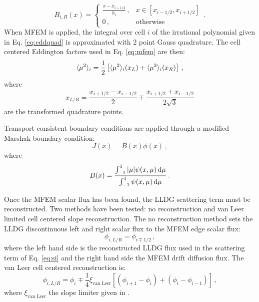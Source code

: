 	\begin{equation}
		B_{i,R}(x) = \begin{cases}
			\frac{x - x_{i-1/2}}{h_i} \,, & x \in [x_{i-1/2}, x_{i+1/2}] \\ 
			0 \,, & \text{otherwise}
		\end{cases} \,.
	\end{equation}
When MFEM is applied, the integral over cell $i$ of the irrational polynomial given in Eq. \ref{eq:eddquad} is approximated with 2 point Gauss quadrature. The cell centered Eddington factors used in Eq. \ref{eq:mfem} are then: 
	\begin{equation} 
		\langle \mu^2 \rangle_i = \frac{1}{2} \left[ \langle \mu^2 \rangle_i(x_L) + \langle \mu^2 \rangle_i(x_R) \right] \,,
	\end{equation}
where 
	\begin{equation}
		x_{L/R} = \frac{x_{i+1/2} - x_{i-1/2}}{2} \mp \frac{x_{i+1/2} + x_{i-1/2}}{2\sqrt{3}}
	\end{equation}
are the transformed quadrature points. 

Transport consistent boundary conditions are applied through a modified Marshak boundary condition: 
	\begin{equation} 
		J(x) = B(x) \phi(x) \,,
	\end{equation} 
where 
	\begin{equation} 
		B(x) = \frac{\int_{-1}^1 |\mu| \psi(x, \mu) \mathop{}\!\mathrm{d} \mu}
		{\int_{-1}^1 \psi(x, \mu) \mathop{}\!\mathrm{d} \mu} \,. 
	\end{equation}

Once the MFEM scalar flux has been found, the LLDG scattering term must be reconstructed. Two methods have been tested: no reconstruction and van Leer limited cell centered slope reconstruction. The no reconstruction method sets the LLDG discontinuous left and right scalar flux to the MFEM edge scalar flux: 
	\begin{equation} 
		\phi_{i,L/R} = \phi_{i\mp1/2} \,,
	\end{equation} 
where the left hand side is the reconstructed LLDG flux used in the scattering term of Eq. \ref{eq:si} and the right hand side the MFEM drift diffusion flux. The van Leer cell centered reconstruction is: 
	\begin{equation} 
		\phi_{i,L/R} = \phi_i \mp \frac{1}{4} \xi_\text{van Leer} \left[\left(\phi_{i+1} - \phi_i\right) + \left(\phi_i - \phi_{i-1}\right) \right] \,,
	\end{equation}
where $\xi_\text{van Leer}$ the slope limiter given in \cite{vanLeer}. 